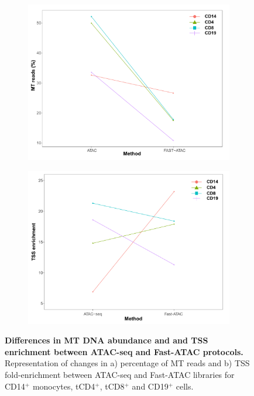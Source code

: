 \begin{figure}[htbp]
\centering
\begin{subfigure}{0.5\textwidth}
\centering
\includegraphics[width=\textwidth]{./Results1/pdfs/ATAC_vs_FAST_ATAC_percnt_MT_reads_dotplot}
\caption{\textbf{}}
\end{subfigure}%
\begin{subfigure}{0.5\textwidth}
\centering
\includegraphics[width=\textwidth]{./Results1/pdfs/ATAC_vs_FAST_ATAC_tss_dotplot}
\caption{\textbf{}}
\end{subfigure}
\caption[Differences in MT DNA abundance and and TSS enrichment between ATAC-seq and Fast-ATAC protocols.]{\textbf{Differences in MT DNA abundance and and TSS enrichment between ATAC-seq and Fast-ATAC protocols.} Representation of changes in a) percentage of MT reads and b) TSS fold-enrichment between ATAC-seq and Fast-ATAC libraries for CD14$^+$ monocytes, tCD4$^+$, tCD8$^+$ and CD19$^+$ cells.}
\label{figure:ATAC_vs_FAST_ATAC}
\end{figure} 



